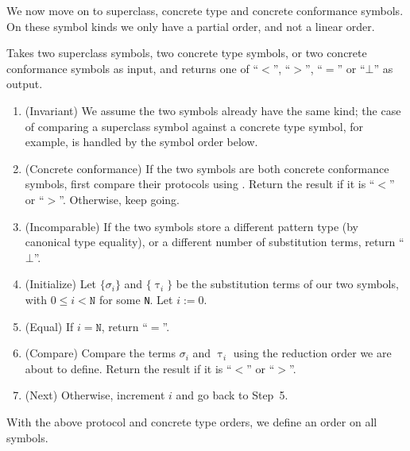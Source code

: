 \documentclass[../generics]{subfiles}
\begin{document}
%
%
We now move on to superclass, concrete type and concrete conformance symbols. On these symbol kinds we only have a partial order, and not a linear order.
%
%
%
%
%
\begin{algorithm}\label{concrete reduction order}
Takes two superclass symbols, two concrete type symbols, or two concrete conformance symbols as input,  and returns one of ``$<$'', ``$>$'', ``$=$'' or \index{$\bot$}``$\bot$'' as output.
\begin{enumerate}
\item (Invariant) We assume the two symbols already have the same kind; the case of comparing a superclass symbol against a concrete type symbol, for example, is handled by the symbol order below.
\item (Concrete conformance) If the two symbols are both concrete conformance symbols, first compare their protocols using . Return the result if it is ``$<$'' or ``$>$''. Otherwise, keep going.
\item (Incomparable) If the two symbols store a different pattern type (by canonical type equality), or a different number of substitution terms, return ``$\bot$''.
\item (Initialize) Let $\{\sigma_i\}$ and $\{\uptau_i\}$ be the substitution terms of our two symbols, with $0\le i<\texttt{N}$ for some \texttt{N}. Let $i:=0$.
\item (Equal) If $i=\texttt{N}$, return ``$=$''.
\item (Compare) Compare the terms $\sigma_i$ and $\uptau_i$ using the reduction order we are about to define. Return the result if it is ``$<$'' or ``$>$''.
\item (Next) Otherwise, increment $i$ and go back to Step~5.
\end{enumerate}
\end{algorithm}
With the above protocol and concrete type orders, we define an order on all symbols.
\end{document}

